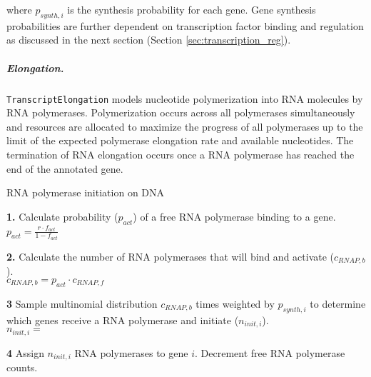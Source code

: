 \documentclass[12pt]{article}
\begin{document}
\noindent where $p_{synth, i}$ is the synthesis probability for each gene. Gene synthesis probabilities are further dependent on transcription factor binding and regulation as discussed in the next section (Section \ref{sec:transcription_reg}).

\subparagraph{Elongation.}
\texttt{TranscriptElongation} models nucleotide polymerization into RNA molecules by RNA polymerases. Polymerization occurs across all polymerases simultaneously and resources are allocated to maximize the progress of all polymerases up to the limit of the expected polymerase elongation rate and available nucleotides. The termination of RNA elongation occurs once a RNA polymerase has reached the end of the annotated gene. \\

\begin{algorithm}[H]
\caption{RNA polymerase initiation on DNA}
\label{transcript_initiation_algorithm}

  \textbf{1.} Calculate probability ($p_{act}$) of a free RNA polymerase binding to a gene.\\
    \-\hspace{1cm} $p_{act} = \frac{r \cdot f_{act}}{1 - f_{act}}$

    \textbf{2.} Calculate the number of RNA polymerases that will bind and activate ($c_{RNAP,b}$).\\
    \-\hspace{1cm} $c_{RNAP,b} = p_{act} \cdot c_{RNAP,f}$

    \textbf{3} Sample multinomial distribution $c_{RNAP,b}$ times weighted by $p_{synth,i}$ to determine which genes receive a RNA polymerase and initiate ($n_{init,i}$).\\
    \-\hspace{1cm} $n_{init,i} =$ 

    \textbf{4} Assign $n_{init,i}$ RNA polymerases to gene $i$. Decrement free RNA polymerase counts.\\


\end{algorithm}
\newpage
\end{document}
